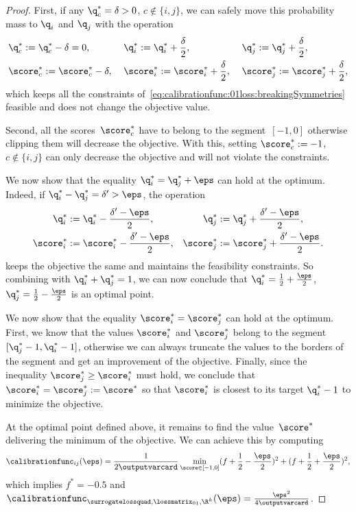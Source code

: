 \documentclass{article}
\begin{document}
\begin{proof}
First, if any $\q^*_c=\delta > 0$, $c\not\in\{i, j\}$, we can safely move this probability mass to $\q_i$ and $\q_j$ with the operation
\begin{align*}
&\q^*_c := \q^*_c -\delta = 0, \; &&\q^*_i := \q^*_i +\frac{\delta}{2}, \; &&\q^*_j := \q^*_j +\frac{\delta}{2},\\
&\score^*_c := \score^*_c -\delta, \; &&\score^*_i := \score^*_i +\frac{\delta}{2}, \; &&\score^*_j := \score^*_j +\frac{\delta}{2},
\end{align*}
which keeps all the constraints of~\eqref{eq:calibrationfunc:01loss:breakingSymmetries} feasible and does not change the objective value.

Second, all the scores~$\score^*_c$ have to belong to the segment~$[-1, 0]$ otherwise clipping them will decrease the objective.
With this, setting $\score^*_c := -1$, $c\not\in\{i, j\}$ can only decrease the objective and will not violate the constraints.

We now show that the equality $\q^*_i = \q^*_j + \eps$ can hold at the optimum.
Indeed, if $\q^*_i - \q^*_j = \delta' >  \eps$, the operation
\begin{align}
\label{eq:tfproofs:truncatingToEps}
\q_i^* &:= \q_i^* - \frac{\delta'-\eps}{2}, &
\q_{j}^* &:= \q_{j}^* + \frac{\delta'-\eps}{2}, \\
\notag\score_i^* &:= \score_i^* - \frac{\delta'-\eps}{2}, &
\score_j^* &:= \score_j^* + \frac{\delta'-\eps}{2}.
\end{align}
keeps the objective the same and maintains the feasibility constraints. So combining with $\q^*_i + \q^*_j = 1$, we can now conclude that $\q^*_i = \frac12 + \frac{\eps}{2}$,  $\q^*_j = \frac12 - \frac{\eps}{2}$ is an optimal point.

We now show that the equality $\score^*_i = \score^*_j$ can hold at the optimum. First, we know that the values $\score^*_i$ and $\score^*_j$ belong to the segment $[\q^*_j-1,\q^*_i-1]$, otherwise we can always truncate the values to the borders of the segment and get an improvement of the objective. Finally, since the inequality $\score^*_j \geq \score^*_i$ must hold, we conclude that $\score^*_i = \score^*_j := \score^*$ so that $\score^*_i$ is closest to its target $\q^*_i-1$ to minimize the objective. 

At the optimal point defined above, it remains to find the value~$\score^*$ delivering the minimum of the objective.
We can achieve this by computing 
\[
\calibrationfunc_{ij}(\eps) = \frac{1}{2\outputvarcard} \min_{\score \in [-1, 0]}  (f +\frac12 -\frac{\eps}{2})^2 + (f +\frac12 +\frac{\eps}{2})^2,
\]
which implies $f^* = -0.5$ and $\calibrationfunc_{\surrogatelossquad,\lossmatrix_{01},\R^k}(\eps) = \frac{\eps^2}{4\outputvarcard}$.
\end{proof}
\end{document}
